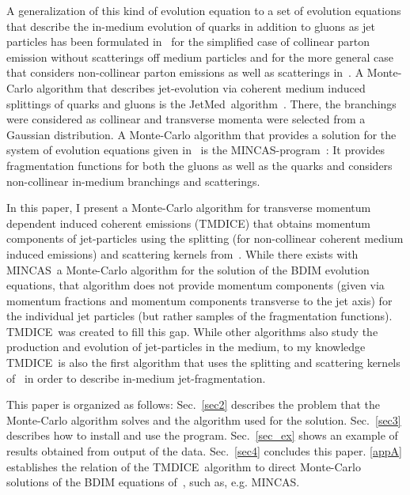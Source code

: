 \documentclass[preprint,12pt]{elsarticle}
\newcommand{\tmdice}{{\sf TMDICE}}
\newcommand{\mincas}{{\sf MINCAS}}
\newcommand{\jetmed}{{\sf JetMed}}
\begin{document}
A generalization of this kind of evolution equation to a set of evolution equations that describe the in-medium evolution of quarks in addition to gluons as jet particles has been formulated in~\cite{Mehtar-Tani:2018zba} for the simplified case of collinear parton emission without scatterings off medium particles and for the more general case that considers non-collinear parton emissions as well as scatterings in~\cite{Blanco:2021usa}.
%
A Monte-Carlo algorithm that describes jet-evolution via coherent medium induced splittings of quarks and gluons is the \jetmed\, algorithm~\cite{caucal:tel-03081993}. There, the branchings were considered as collinear and transverse momenta were selected from a Gaussian distribution.
A Monte-Carlo algorithm that provides a solution for the system of evolution equations given in~\cite{Blaizot:2013vha,Mehtar-Tani:2018zba,Blanco:2021usa} is the \mincas-program~\cite{Kutak:2018dim,Blanco:2020uzy,Blanco:2021usa}: 
It provides fragmentation functions for both the gluons as well as the quarks and considers non-collinear in-medium branchings and scatterings.

In this paper, I present a Monte-Carlo algorithm for transverse momentum dependent induced coherent emissions (\tmdice) that obtains momentum components of jet-particles using the splitting (for non-collinear coherent medium induced emissions) and scattering kernels from~\cite{Blanco:2021usa}.  
While there exists with \mincas\, a Monte-Carlo algorithm for the solution of the BDIM evolution equations, that algorithm does not provide momentum components (given via momentum fractions and momentum components transverse to the jet axis) for 
the individual jet particles (but rather samples of the fragmentation functions). 
\tmdice\, was created to fill this gap.
While other algorithms also study the production and evolution of jet-particles in the medium, to my knowledge \tmdice\, is also the first algorithm that uses the splitting and scattering kernels of~\cite{Blaizot:2012fh,Blaizot:2013vha,Blanco:2021usa} in order to describe in-medium jet-fragmentation.

This paper is organized as follows:
Sec.~\ref{sec2} describes the problem that the Monte-Carlo algorithm solves and the algorithm used for the solution.
Sec.~\ref{sec3} describes how to install and use the program.
Sec.~\ref{sec_ex} shows an example of results obtained from output of the data.
Sec.~\ref{sec4} concludes this paper.
\ref{appA} establishes the relation of the \tmdice\, algorithm to direct Monte-Carlo solutions of the BDIM equations of~\cite{Blaizot:2013vha,Blanco:2021usa}, such as, e.g. \mincas.
\end{document}
